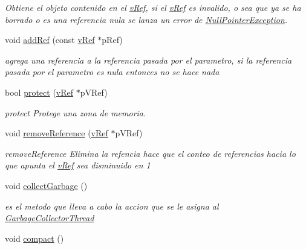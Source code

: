 \begin{DoxyCompactItemize}
\begin{DoxyCompactList}\small\item\em Obtiene el objeto contenido en el \hyperlink{classv_ref}{v\-Ref}, si el \hyperlink{classv_ref}{v\-Ref} es invalido, o sea que ya se ha borrado o es una referencia nula se lanza un error de \hyperlink{class_null_pointer_exception}{Null\-Pointer\-Exception}. \end{DoxyCompactList}\item 
void \hyperlink{classv_heap_a4691f4ba088fe19eb2bcaedf90205eb5}{add\-Ref} (const \hyperlink{classv_ref}{v\-Ref} $\ast$p\-Ref)
\begin{DoxyCompactList}\small\item\em agrega una referencia a la referencia pasada por el parametro, si la referencia pasada por el parametro es nula entonces no se hace nada \end{DoxyCompactList}\item 
bool \hyperlink{classv_heap_a56ee2409f56a8117fd3b04434803b3ba}{protect} (\hyperlink{classv_ref}{v\-Ref} $\ast$p\-V\-Ref)
\begin{DoxyCompactList}\small\item\em protect Protege una zona de memoria. \end{DoxyCompactList}\item 
void \hyperlink{classv_heap_a156d31e57a36f093898e4b302e5f270a}{remove\-Reference} (\hyperlink{classv_ref}{v\-Ref} $\ast$p\-V\-Ref)
\begin{DoxyCompactList}\small\item\em remove\-Reference Elimina la refencia hace que el conteo de referencias hacia lo que apunta el \hyperlink{classv_ref}{v\-Ref} sea disminuido en 1 \end{DoxyCompactList}\item 
\hypertarget{classv_heap_af893c48a50166f6e144829e070afa0f0}{void \hyperlink{classv_heap_af893c48a50166f6e144829e070afa0f0}{collect\-Garbage} ()}\label{classv_heap_af893c48a50166f6e144829e070afa0f0}

\begin{DoxyCompactList}\small\item\em es el metodo que lleva a cabo la accion que se le asigna al \hyperlink{class_garbage_collector_thread}{Garbage\-Collector\-Thread}\end{DoxyCompactList}\item 
\hypertarget{classv_heap_ac64f5a67b13397c87cfe594dab278020}{void \hyperlink{classv_heap_ac64f5a67b13397c87cfe594dab278020}{compact} ()}\label{classv_heap_ac64f5a67b13397c87cfe594dab278020}


\end{DoxyCompactItemize}
